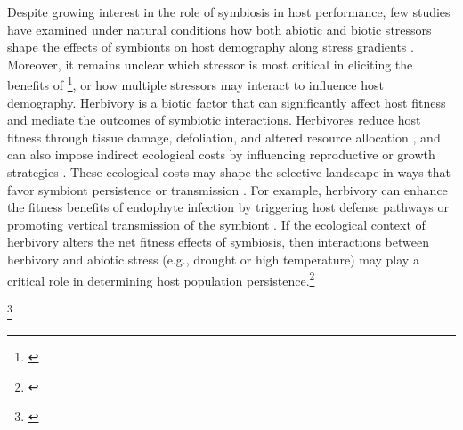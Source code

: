 \documentclass[12pt]{article}\usepackage[]{graphicx}\usepackage[dvipsnames]{xcolor}
\newcommand{\tom}[2]{{\color{red}{#1}}\footnote{\textit{\color{red}{#2}}}}
\begin{document}
Despite growing interest in the role of symbiosis in host performance, few studies have examined under natural conditions how both abiotic and biotic stressors shape the effects of symbionts on host demography along stress gradients \citep{louthan2015and}. 
Moreover, it remains unclear which stressor is most critical in eliciting the benefits of \tom{endophyte symbiosis}{What is the intended scope at this point in the paper? Is this meant to be a general statement about microbial symbioses, or are we now talking specifically about Epichloe symbioses in grasses? I think the Intro can provide clearer sign-posting for this. There is a lot of literature on drought and herbivory in the Epichloe literature. I think it would be good to have a paragraph late in the Intro that introduces this system and briefly covers the literature on drought and herbivory, highligting that few (or no?) previous studies have looked at both.}, or how multiple stressors may interact to influence host demography. 
Herbivory is a biotic factor that can significantly affect host fitness \citep{benning2019biotic} and mediate the outcomes of symbiotic interactions. 
Herbivores reduce host fitness through tissue damage, defoliation, and altered resource allocation \citep{maron2006herbivory}, and can also impose indirect ecological costs by influencing reproductive or growth strategies \citep{miller2008herbivore}. 
These ecological costs may shape the selective landscape in ways that favor symbiont persistence or transmission \citep{clay2005herbivores}. 
For example, herbivory can enhance the fitness benefits of endophyte infection by triggering host defense pathways or promoting vertical transmission of the symbiont \citep{gundel2020simulated,agrawal1999transgenerational}. 
If the ecological context of herbivory alters the net fitness effects of symbiosis, then interactions between herbivory and abiotic stress (e.g., drought or high temperature) may play a critical role in determining host population persistence.\tom{}{The opening sentence suggested that this paragraph would be about the combined and relative roles of abiotic and biotic stress, but most of this paragraph is actually about herbivory. Again, bring attention to the way you structure paragraphs. Use clear topic sentences, and make sure the content of the paragraph stays true to the topic sentence. }

\tom{}{Here is where I might dedicate a paragraph to describing the biology and context-dependence of the grass-endophyte symbioses.}
\end{document}

